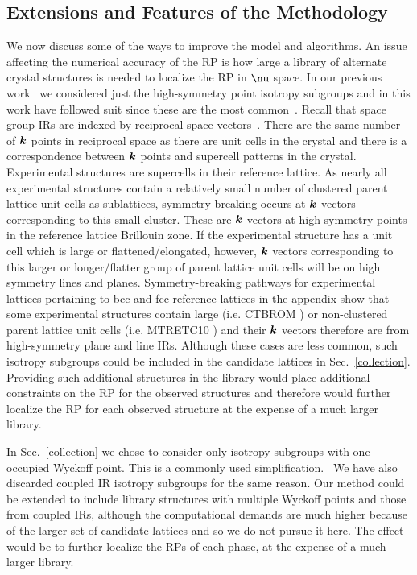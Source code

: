 \documentclass[preprint]{iucr}              %
\newcommand{\mb}[1]{\ensuremath{\mbox{\boldmath $ #1 $}}}
\begin{document}
\subsection{Extensions and Features of the Methodology}
\label{extensions}

We now discuss some of the ways to improve the model and algorithms.
An issue affecting the numerical accuracy of the RP is how large a
library of alternate crystal structures is needed to localize the RP
in $\mb{\nu}$ space. In our previous work~\cite{Mettes04} we
considered just the high-symmetry point isotropy subgroups and in
this work have followed suit since these are the most
common~\cite{Stokes88}. Recall that space group IRs are indexed by
reciprocal space vectors~\cite{Kovalev93,Zak69}. There are the same
number of $\mb{k}$ points in reciprocal space as there are unit
cells in the crystal and there is a correspondence between $\mb{k}$
points and supercell patterns in the crystal. Experimental
structures are supercells in their reference lattice. As nearly all
experimental structures contain a relatively small number of
clustered parent lattice unit cells as sublattices,
symmetry-breaking occurs at $\mb{k}$ vectors corresponding to this
small cluster.  These are $\mb{k}$ vectors at high symmetry points
in the reference lattice Brillouin zone. If the experimental
structure has a unit cell which is large or flattened/elongated,
however, $\mb{k}$ vectors corresponding to this larger or
longer/flatter group of parent lattice unit cells will be on high
symmetry lines and planes. Symmetry-breaking pathways for experimental lattices
pertaining to bcc and fcc reference lattices in the appendix show that some
experimental structures contain
large (i.e. CTBROM \cite{More77}) or non-clustered parent lattice unit cells
(i.e. MTRETC10 \cite{Harrison72}) and their $\mb{k}$ vectors therefore are from
high-symmetry
plane and line IRs. Although these cases are less common, such
isotropy subgroups could be included in the candidate lattices in
Sec.~\ref{collection}. Providing such additional structures in the
library would place additional constraints on the RP for the
observed structures and therefore would further localize the RP for each
observed structure at the expense of a much larger library.

In Sec.~\ref{collection} we chose to consider only isotropy
subgroups with one occupied Wyckoff point. This is a commonly used
simplification.~\cite{Verwer98} We have also discarded coupled IR
isotropy subgroups for the same reason. Our method could be extended
to include library structures with multiple Wyckoff points and those
from coupled IRs, although the computational demands are much higher
because of the larger set of candidate lattices and so we do not
pursue it here. The effect would be to further localize the RPs of
each phase, at the expense of a much larger library.
\end{document}
